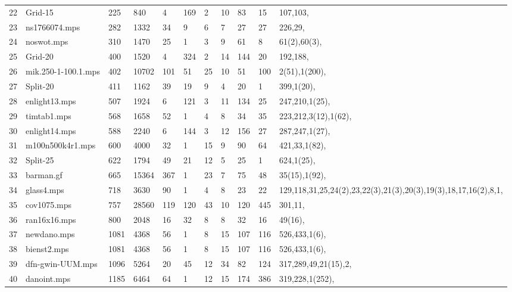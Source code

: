 \documentclass{article}
\begin{document}
\begin{longtable}{|l |l |l |l |l |l |l |l |l |l |l |}
22&Grid-15&225&840&4&169&2&10&83&15&107,103,\\
23&ns1766074.mps&282&1332&34&9&6&7&27&27&226,29,\\
24&noswot.mps&310&1470&25&1&3&9&61&8&61(2),60(3),\\
25&Grid-20&400&1520&4&324&2&14&144&20&192,188,\\
26&mik.250-1-100.1.mps&402&10702&101&51&25&10&51&100&2(51),1(200),\\
27&Split-20&411&1162&39&19&9&4&20&1&399,1(20),\\
28&enlight13.mps&507&1924&6&121&3&11&134&25&247,210,1(25),\\
29&timtab1.mps&568&1658&52&1&4&8&34&35&223,212,3(12),1(62),\\
30&enlight14.mps&588&2240&6&144&3&12&156&27&287,247,1(27),\\
31&m100n500k4r1.mps&600&4000&32&1&15&9&90&64&421,33,1(82),\\
32&Split-25&622&1794&49&21&12&5&25&1&624,1(25),\\
33&barman.gf&665&15364&367&1&23&7&75&48&35(15),1(92),\\
34&glass4.mps&718&3630&90&1&4&8&23&22&129,118,31,25,24(2),23,22(3),21(3),20(3),19(3),18,17,16(2),8,1,\\
35&cov1075.mps&757&28560&119&120&43&10&120&445&301,11,\\
36&ran16x16.mps&800&2048&16&32&8&8&32&16&49(16),\\
37&newdano.mps&1081&4368&56&1&8&15&107&116&526,433,1(6),\\
38&bienst2.mps&1081&4368&56&1&8&15&107&116&526,433,1(6),\\
39&dfn-gwin-UUM.mps&1096&5264&20&45&12&34&82&124&317,289,49,21(15),2,\\
40&danoint.mps&1185&6464&64&1&12&15&174&386&319,228,1(252),\\
\hline
\end{longtable}
\end{document}
